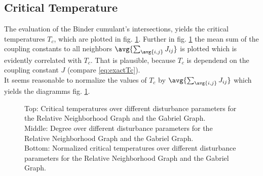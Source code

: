 \subsection{Critical Temperature}
    The evaluation of the Binder cumulant's intersections, yields the
    critical temperatures \(T_c\), which are plotted in
    fig. \ref{fig:Tc}.
    Further in fig. \ref{fig:Tc}
    the mean sum of the coupling constants to all neighbors \(\avg{\sum_{\avg{i,j}} J_{ij}}\)
    is plotted which is evidently correlated with \(T_c\).
    That is plausible, because \(T_c\) is dependend on the coupling
    constant \(J\) (compare \eqref{eq:exactTc}).\\
    It seems reasonable to normalize the values of \(T_{c}\) by
    \(\avg{\sum_{\avg{i,j}} J_{ij}}\) which yields the diagramms fig.
    \ref{fig:Tc}.


    \begin{figure}[htbp]
        \centering


        \caption[Critical Temperature over different disturbance parameters]
                {Top: Critical temperatures over different
                 disturbance parameters for
                  the Relative Neighborhood Graph and
                  the Gabriel Graph.\\
                 Middle: Degree over different disturbance parameters for
                  the Relative Neighborhood Graph and
                  the Gabriel Graph.\\
                 Bottom: Normalized critical temperatures over different
                 disturbance parameters for
                  the Relative Neighborhood Graph and
                  the Gabriel Graph.
                }
        \label{fig:Tc}
    \end{figure}

